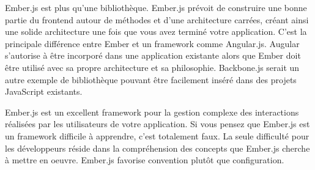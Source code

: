 Ember.js est plus qu’une bibliothèque. Ember.js prévoit de construire une bonne partie du frontend autour de méthodes et d’une architecture carrées, créant ainsi une solide architecture une fois que vous avez terminé votre application. C’est la principale différence entre Ember et un framework comme Angular.js. Augular s’autorise à être incorporé dans une application existante alors que Ember doit être utilisé avec sa propre architecture et sa philosophie. Backbone.js serait un autre exemple de bibliothèque pouvant être facilement inséré dans des projets JavaScript existants.

Ember.js est un excellent framework pour la gestion complexe des interactions réalisées par les utilisateurs de votre application. Si vous pensez que Ember.js est un framework difficile à apprendre, c’est totalement faux. La seule difficulté pour les développeurs réside dans la compréhension des concepts que Ember.js cherche à mettre en oeuvre. Ember.js favorise convention plutôt que configuration.
